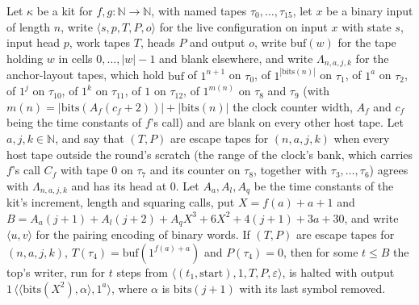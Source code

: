 \begin{theorem}
\label{Turing.NTimeDiag.qy_top_run}
\leanok
{}
Let $\kappa$ be a kit for $f, g : \mathbb{N} \to \mathbb{N}$, with named tapes $\tau_0, \dots,
\tau_{15}$, let $x$ be a binary input of length $n$, write $\langle s, p, T, P, o\rangle$ for the
live configuration on input $x$ with state $s$, input head $p$, work tapes $T$, heads $P$ and
output $o$, write $\mathrm{buf}(w)$ for the tape holding $w$ in cells $0, \dots, |w| - 1$ and blank
elsewhere, and write $\Lambda_{n,a,j,k}$ for the anchor-layout tapes, which hold $\mathrm{buf}$ of
$1^{n+1}$ on $\tau_0$, of $1^{|\mathrm{bits}(n)|}$ on $\tau_1$, of $1^a$ on $\tau_2$, of $1^j$ on
$\tau_{10}$, of $1^k$ on $\tau_{11}$, of $1$ on $\tau_{12}$, of $1^{m(n)}$ on $\tau_8$ and $\tau_9$
(with $m(n) = |\mathrm{bits}(A_f(c_f + 2))| + |\mathrm{bits}(n)|$ the clock counter width, $A_f$
and $c_f$ being the time constants of $f$'s call) and are blank on every other host tape. Let $a,
j, k \in \mathbb{N}$, and say that $(T, P)$ are escape tapes for $(n, a, j, k)$ when every host
tape outside the round's scratch (the range of the clock's bank, which carries $f$'s call $C_f$
with tape $0$ on $\tau_7$ and its counter on $\tau_8$, together with $\tau_3, \dots, \tau_6$)
agrees with $\Lambda_{n,a,j,k}$ and has its head at $0$. Let $A_a, A_l, A_q$ be the time constants
of the kit's increment, length and squaring calls, put $X = f(a) + a + 1$ and $B = A_a(j + 1) +
A_l(j + 2) + A_q X^3 + 6X^2 + 4(j + 1) + 3a + 30$, and write $\langle u, v\rangle$ for the pairing
encoding of binary words. If $(T, P)$ are escape tapes for $(n, a, j, k)$, $T(\tau_4) =
\mathrm{buf}(1^{f(a) + a})$ and $P(\tau_4) = 0$, then for some $t \le B$ the top's writer, run for
$t$ steps from $\langle (t_1, \mathrm{start}), 1, T, P, \varepsilon\rangle$, is halted with output
$1\,\langle\langle \mathrm{bits}(X^2), \alpha\rangle, 1^a\rangle$, where $\alpha$ is
$\mathrm{bits}(j + 1)$ with its last symbol removed.
\end{theorem}

